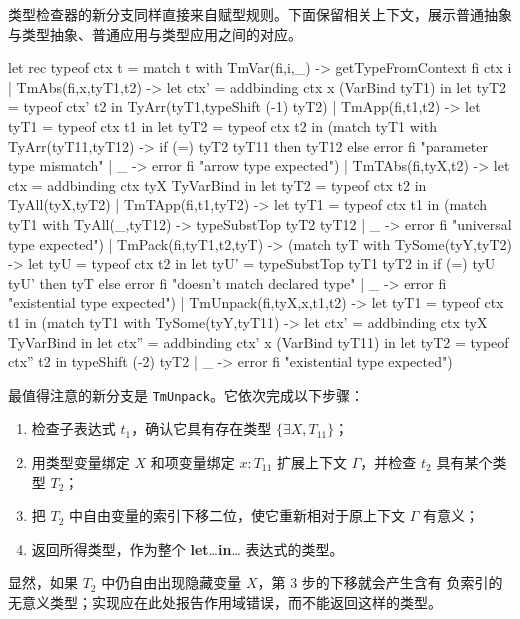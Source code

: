 类型检查器的新分支同样直接来自赋型规则。下面保留相关上下文，展示普通抽象
与类型抽象、普通应用与类型应用之间的对应。
\begin{taplocamlcode}
let rec typeof ctx t = match t with
    TmVar(fi,i,_) -> getTypeFromContext fi ctx i
  | TmAbs(fi,x,tyT1,t2) ->
      let ctx' = addbinding ctx x (VarBind tyT1) in
      let tyT2 = typeof ctx' t2 in
      TyArr(tyT1,typeShift (-1) tyT2)
  | TmApp(fi,t1,t2) ->
      let tyT1 = typeof ctx t1 in
      let tyT2 = typeof ctx t2 in
      (match tyT1 with
         TyArr(tyT11,tyT12) ->
           if (=) tyT2 tyT11 then tyT12
           else error fi "parameter type mismatch"
       | _ -> error fi "arrow type expected")
  | TmTAbs(fi,tyX,t2) ->
      let ctx = addbinding ctx tyX TyVarBind in
      let tyT2 = typeof ctx t2 in
      TyAll(tyX,tyT2)
  | TmTApp(fi,t1,tyT2) ->
      let tyT1 = typeof ctx t1 in
      (match tyT1 with
         TyAll(_,tyT12) -> typeSubstTop tyT2 tyT12
       | _ -> error fi "universal type expected")
  | TmPack(fi,tyT1,t2,tyT) ->
      (match tyT with
         TySome(tyY,tyT2) ->
           let tyU = typeof ctx t2 in
           let tyU' = typeSubstTop tyT1 tyT2 in
           if (=) tyU tyU' then tyT
           else error fi "doesn't match declared type"
       | _ -> error fi "existential type expected")
  | TmUnpack(fi,tyX,x,t1,t2) ->
      let tyT1 = typeof ctx t1 in
      (match tyT1 with
         TySome(tyY,tyT11) ->
           let ctx' = addbinding ctx tyX TyVarBind in
           let ctx'' = addbinding ctx' x (VarBind tyT11) in
           let tyT2 = typeof ctx'' t2 in
           typeShift (-2) tyT2
       | _ -> error fi "existential type expected")
\end{taplocamlcode}

最值得注意的新分支是 \texttt{TmUnpack}。它依次完成以下步骤：
\begin{enumerate}
  \item 检查子表达式 \(t_1\)，确认它具有存在类型
        \(\{\exists X,T_{11}\}\)；
  \item 用类型变量绑定 \(X\) 和项变量绑定 \(x:T_{11}\) 扩展上下文
        \(\Gamma\)，并检查 \(t_2\) 具有某个类型 \(T_2\)；
  \item 把 \(T_2\) 中自由变量的索引下移二位，使它重新相对于原上下文
        \(\Gamma\) 有意义；
  \item 返回所得类型，作为整个 \textbf{let}\ldots\textbf{in}\ldots
        表达式的类型。
\end{enumerate}
显然，如果 \(T_2\) 中仍自由出现隐藏变量 \(X\)，第 3 步的下移就会产生含有
负索引的无意义类型；实现应在此处报告作用域错误，而不能返回这样的类型。

